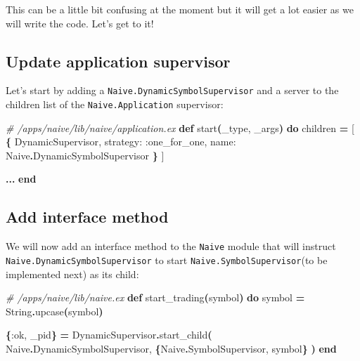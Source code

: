 \documentclass[
  oneside]{book}
\newenvironment{Shaded}{\begin{snugshade}}{\end{snugshade}}
\newcommand{\CommentTok}[1]{\textcolor[rgb]{0.56,0.35,0.01}{\textit{#1}}}
\newcommand{\ConstantTok}[1]{\textcolor[rgb]{0.56,0.35,0.01}{#1}}
\newcommand{\FunctionTok}[1]{\textcolor[rgb]{0.13,0.29,0.53}{\textbf{#1}}}
\newcommand{\KeywordTok}[1]{\textcolor[rgb]{0.13,0.29,0.53}{\textbf{#1}}}
\newcommand{\NormalTok}[1]{#1}
\newcommand{\OperatorTok}[1]{\textcolor[rgb]{0.81,0.36,0.00}{\textbf{#1}}}
\newcommand{\OtherTok}[1]{\textcolor[rgb]{0.56,0.35,0.01}{#1}}
\newcommand{\VariableTok}[1]{\textcolor[rgb]{0.00,0.00,0.00}{#1}}
\begin{document}
This can be a little bit confusing at the moment but it will get a lot easier
as we will write the code. Let's get to it!

\subsection{Update application supervisor}\label{update-application-supervisor}

Let's start by adding a \texttt{Naive.DynamicSymbolSupervisor} and a server to the children list of the \texttt{Naive.Application} supervisor:

\begin{Shaded}
\begin{Highlighting}[]
  \CommentTok{\# /apps/naive/lib/naive/application.ex}
  \KeywordTok{def}\NormalTok{ start}\FunctionTok{(}\NormalTok{\_type, \_args}\FunctionTok{)} \KeywordTok{do}
\NormalTok{    children }\OperatorTok{=} \OtherTok{[}
      \FunctionTok{\{}
        \ConstantTok{DynamicSupervisor}\NormalTok{,}
        \VariableTok{strategy:} \VariableTok{:one\_for\_one}\NormalTok{,}
        \VariableTok{name:} \ConstantTok{Naive}\OperatorTok{.}\ConstantTok{DynamicSymbolSupervisor}
      \FunctionTok{\}}
    \OtherTok{]}

    \OperatorTok{...}
  \KeywordTok{end}
\end{Highlighting}
\end{Shaded}

\subsection{Add interface method}\label{add-interface-method}

We will now add an interface method to the \texttt{Naive} module that will instruct\\
\texttt{Naive.DynamicSymbolSupervisor} to start \texttt{Naive.SymbolSupervisor}(to be implemented next) as its child:

\begin{Shaded}
\begin{Highlighting}[]
  \CommentTok{\# /apps/naive/lib/naive.ex}
  \KeywordTok{def}\NormalTok{ start\_trading}\FunctionTok{(}\NormalTok{symbol}\FunctionTok{)} \KeywordTok{do}
\NormalTok{    symbol }\OperatorTok{=} \ConstantTok{String}\OperatorTok{.}\NormalTok{upcase}\FunctionTok{(}\NormalTok{symbol}\FunctionTok{)}

    \FunctionTok{\{}\VariableTok{:ok}\NormalTok{, \_pid}\FunctionTok{\}} \OperatorTok{=}
      \ConstantTok{DynamicSupervisor}\OperatorTok{.}\NormalTok{start\_child}\FunctionTok{(}
        \ConstantTok{Naive}\OperatorTok{.}\ConstantTok{DynamicSymbolSupervisor}\NormalTok{,}
        \FunctionTok{\{}\ConstantTok{Naive}\OperatorTok{.}\ConstantTok{SymbolSupervisor}\NormalTok{, symbol}\FunctionTok{\}}
      \FunctionTok{)}
  \KeywordTok{end}
\end{Highlighting}
\end{Shaded}
\end{document}

